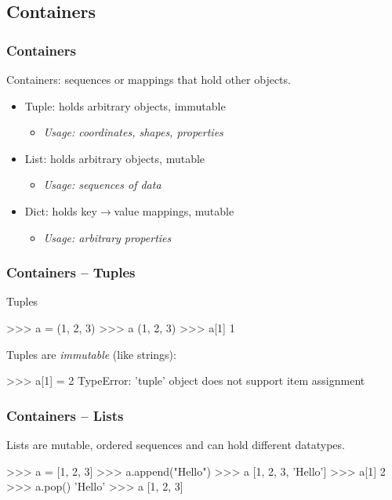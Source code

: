 \documentclass[xetex,10pt]{beamer}
\def\spacer{\vspace*{1em}}
\begin{document}
\subsection{Containers}

\begin{frame}[fragile]
	\frametitle{Containers}

	Containers: sequences or mappings that hold other objects.

	\spacer

	\begin{itemize}
		\item Tuple: holds arbitrary objects, immutable
			\begin{itemize}
			\item \emph{Usage: coordinates, shapes, properties}
			\end{itemize}
		\pause
		\item List: holds arbitrary objects, mutable
			\begin{itemize}
			\item \emph{Usage: sequences of data}
			\end{itemize}
		\pause
		\item Dict: holds key$\rightarrow$value mappings, mutable
			\begin{itemize}
			\item \emph{Usage: arbitrary properties}
			\end{itemize}
	\end{itemize}
	
\end{frame}

\begin{frame}[fragile]
	\frametitle{Containers -- Tuples}

Tuples
\begin{python}
>>> a = (1, 2, 3)
>>> a
(1, 2, 3)
>>> a[1]
1
\end{python}

	\spacer
	\pause
Tuples are \emph{immutable} (like strings):
\begin{python}
>>> a[1] = 2
TypeError: 'tuple' object does not support item assignment
\end{python}
\end{frame}

\begin{frame}[fragile]
	\frametitle{Containers -- Lists}

Lists are mutable, ordered sequences and can hold different datatypes.
\begin{python}
>>> a = [1, 2, 3]
>>> a.append("Hello")
>>> a
[1, 2, 3, 'Hello']
>>> a[1]
2
>>> a.pop()
'Hello'
>>> a
[1, 2, 3]
\end{python}

\end{frame}
\end{document}
